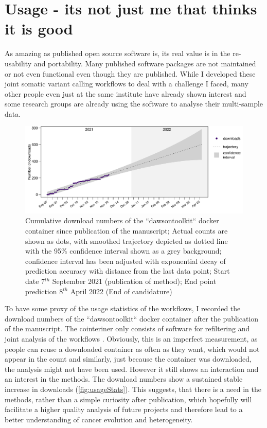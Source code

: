 \section[Usage]{Usage - its not just me that thinks it is good}
\label{variantcalling-sec:usage}
As amazing as published open source software is, its real value is in the re-usability and portability. Many published software packages are not maintained or not even functional even though they are published. While I developed these joint somatic variant calling workflows to deal with a challenge I faced, many other people even just at the same institute have already shown interest and some research groups are already using the software to analyse their multi-sample data.

\begin{figure}[!ht]
\centering
\includegraphics[width=.99\linewidth]{Figures/dawsontoolkitDownloads.pdf}
\caption[Usage statistics joint workflows]{Cumulative download numbers of the ``dawsontoolkit`` docker container since publication of the manuscript; Actual counts are shown as dots, with smoothed trajectory depicted as dotted line with the 95\% confidence interval shown as a grey background; confidence interval has been adjusted with exponential decay of prediction accuracy with distance from the last data point; Start date 7$^{th}$ September 2021 (publication of method); End point prediction 8$^{th}$ April 2022 (End of candidature)}\label{fig:usageStats}
\end{figure}

To have some proxy of the usage statistics of the workflows, I recorded the download numbers of the ``dawsontoolkit`` docker container after the publication of the manuscript. The cointeriner only consists of software for refiltering and joint analysis of the workflows . Obviously, this is an imperfect measurement, as people can reuse a downloaded container as often as they want, which would not appear in the count and similarly, just because the container was downloaded, the analysis might not have been used. However it still shows  an interaction and an interest in the methods. The download numbers show a sustained stable increase in downloads (\autoref{fig:usageStats}). This suggests, that there is a need in the methods, rather than a simple curiosity after publication, which hopefully will facilitate a higher quality analysis of future projects and therefore lead to a better understanding of cancer evolution and heterogeneity.

